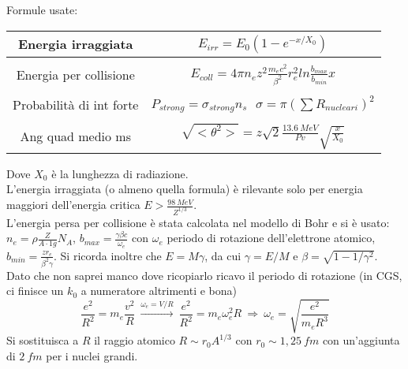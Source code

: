 \documentclass[twoside]{article}
\begin{document}
Formule usate:
\begin{center}
    \begin{tabular}{c|c}
      Energia irraggiata &  \begin{math}
      E_{irr}=E_0(1-e^{-x/X_0})
      \end{math}\\
      \hline \\
        Energia per collisione & \begin{math}
        E_{coll}=4\pi n_e z^2 \frac{m_e c^2}{\beta^2}r_e^2 ln\frac{b_{max}}{b_{min}}x
        \end{math}\\
        \hline \\
        Probabilità di int forte & 
        \begin{math}
        P_{strong}=\sigma_{strong} n_s \ \ \ \sigma=\pi (\sum R_{nucleari})^2
        \end{math}\\
        \hline \\
        Ang quad medio ms & \begin{math}
    \sqrt{<\theta^2>}=z\sqrt{2}\frac{13.6 \ MeV}{Pv}\sqrt{\frac{x}{X_0}}
\end{math}\\
    \end{tabular}
\end{center}
Dove $X_0$ è la lunghezza di radiazione. \\
L'energia irraggiata (o almeno quella formula) è rilevante solo per energia maggiori dell'energia critica $E>\frac{98\ MeV}{Z^{1/3}}$. \\
L'energia persa per collisione è stata calcolata nel modello di Bohr e si è usato:
$n_e=\rho \frac{Z}{A \cdot 1 g}N_A$, $b_{max}=\frac{\gamma \beta c}{\omega_e}$ con $\omega_e$ periodo di rotazione dell'elettrone atomico, $b_{min}=\frac{z r_e}{\beta^2 \gamma}$. Si ricorda inoltre che $E=M\gamma$, da cui $\gamma=E/M$ e $\beta=\sqrt{1-1/\gamma^2}$.
\\
Dato che non saprei manco dove ricopiarlo ricavo il periodo di rotazione (in CGS, ci finisce  un $k_0$ a numeratore altrimenti e bona)
\begin{equation}
    \frac{e^2}{R^2}=m_e \frac{v^2}{R} \ \xrightarrow{\omega_e=V/R} \ \frac{e^2}{R^2}=m_e \omega_e^2 R \ \Rightarrow \ \omega_e=\sqrt{\frac{e^2}{m_e R^3}}
\end{equation}
Si sostituisca a $R$ il raggio atomico $R\sim r_0 A^{1/3}$ con $r_0\sim 1,25 \ fm$ con un'aggiunta di $2 \ fm$ per i nuclei grandi.
\end{document}
